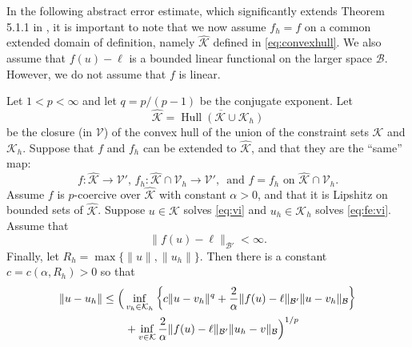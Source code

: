 \documentclass[hidelinks,onefignum,onetabnum,final]{siamart220329}  %
\newcommand{\cB}{\mathcal{B}}
\newcommand{\cK}{\mathcal{K}}
\newcommand{\cV}{\mathcal{V}}
\newcommand{\hcK}{\widehat{\cK}}
\DeclareMathOperator*{\Hull}{Hull}
\begin{document}
In the following abstract error estimate, which significantly extends Theorem 5.1.1 in \cite{Ciarlet2002}, it is important to note that we now assume $f_h=f$ on a common extended domain of definition, namely $\hcK$ defined in \eqref{eq:convexhull}.  We also assume that $f(u)-\ell$ is a bounded linear functional on the larger space $\cB$.  However, we do not assume that $f$ is linear.

\begin{theorem} \label{thm:abstractestimate}
Let $1<p<\infty$ and let $q=p/(p-1)$ be the conjugate exponent.  Let
\begin{equation}
\hcK = \overline{\Hull{(\cK \cup \cK_h)}}  \label{eq:convexhull}
\end{equation}
be the closure (in $\cV$) of the convex hull of the union of the constraint sets $\cK$ and $\cK_h$.  Suppose that $f$ and $f_h$ can be extended to $\hcK$, and that they are the ``same'' map:
\begin{equation}
f:\hcK \to \cV', \, f_h:\hcK \cap \cV_h \to \cV', \, \text{ and } f=f_h \text{ on } \hcK \cap \cV_h.  \label{eq:commonextension}
\end{equation}
Assume $f$ is $p$-coercive over $\hcK$ with constant $\alpha>0$, and that it is Lipshitz on bounded sets of $\hcK$.  Suppose $u\in\cK$ solves \eqref{eq:vi} and $u_h\in\cK_h$ solves \eqref{eq:fe:vi}.  Assume that
\begin{equation}
\|f(u)-\ell\|_{\cB'} < \infty.  \label{eq:fellboundedB}
\end{equation}
Finally, let $R_h=\max\{\|u\|,\|u_h\|\}$.  Then there is a constant $c=c(\alpha,R_h)>0$ so that
\begin{align}
\|u-u_h\| &\le \Big(\inf_{v_h\in\cK_h} \left\{c \|u - v_h\|^q + \frac{2}{\alpha} \|f(u)-\ell\|_{\cB'} \|u-v_h\|_{\cB}\right\} \label{eq:abstractestimate} \\
   &\qquad + \inf_{v\in\cK} \frac{2}{\alpha} \|f(u)-\ell\|_{\cB'} \|u_h-v\|_{\cB}\Big)^{1/p} \notag
\end{align}
\end{theorem}
\end{document}

